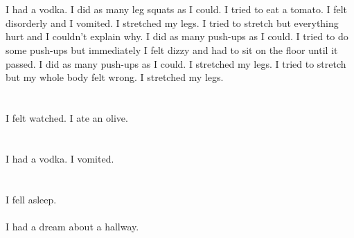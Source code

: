 \documentclass{article}
\begin{document}
    \section{}
    I had a vodka. I did as many leg squats as I could. I tried to eat a tomato. I felt disorderly and I vomited.  I stretched my legs.  I tried to stretch but everything hurt and I couldn't explain why.  I did as many push-ups as I could.  I tried to do some push-ups but immediately I felt dizzy and had to sit on the floor until it passed.   I did as many push-ups as I could.  I stretched my legs.  I tried to stretch but my whole body felt wrong.  I stretched my legs.  
    \newpage
    
    \section{}
    I felt watched. I ate an olive.  
    \newpage
    
    \section{}
    I had a vodka. I vomited.  
    \newpage
    
    \section{}
    I fell asleep.\\\\I had a dream about a hallway.\\\\ 
    \newpage
    
\end{document}
